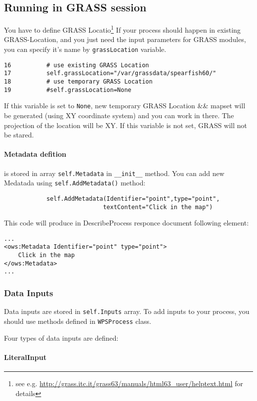 \documentclass[a4paper,11pt]{article}
\begin{document}
\subsection{Running in GRASS session}
You have to define GRASS Locatio\footnote{see e.g.
\url{http://grass.itc.it/grass63/manuals/html63\_user/helptext.html} for details} 
If your process should happen in existing GRASS-Location, and you just need
the input parameters for GRASS modules, you can specify it's name by
\texttt{grassLocation} variable. 
     
\begin{verbatim}
16          # use existing GRASS Location
17          self.grassLocation="/var/grassdata/spearfish60/"
18          # use temporary GRASS Location
19          #self.grassLocation=None
\end{verbatim}

     
If this variable is  set to \texttt{None}, new temporary GRASS Location \&\& mapset will be
generated (using XY coordinate system) and you can work in there. The projection of the location will be
XY. If this variable is not set, GRASS will not be stared.

\paragraph{Metadata defition} is stored in array \texttt{self.Metadata} in
\texttt{\_\_init\_\_} method. You can add new Medatada using
\texttt{self.AddMetadata()} method:
\begin{verbatim}
            self.AddMetadata(Identifier="point",type="point",
                            textContent="Click in the map")
\end{verbatim}

This code will produce in DescribeProcess responce document following
element:
\begin{verbatim}
...
<ows:Metadata Identifier="point" type="point">
    Click in the map
</ows:Metadata>
...
\end{verbatim}

\subsubsection{Data Inputs}
Data inputs are stored in \texttt{self.Inputs} array. To add inputs to
your process, you should use methods defined in \texttt{WPSProcess} class.

Four types of data inputs are defined:

\paragraph{LiteralInput}
\end{document}
